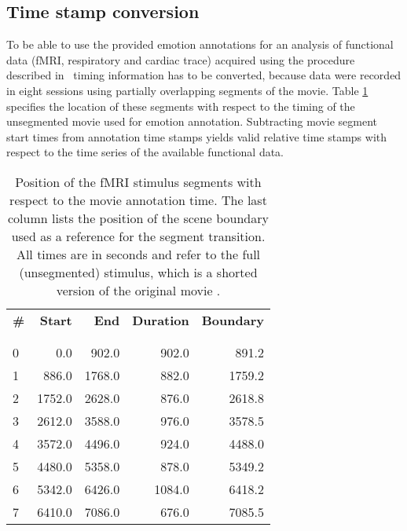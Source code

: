 \subsection*{Time stamp conversion}

To be able to use the provided emotion annotations for an analysis of
functional data (fMRI, respiratory and cardiac trace) acquired using the
procedure described in~\cite{HBI+14} timing information has to be converted,
because data were recorded in eight sessions using partially overlapping
segments of the movie. Table \ref{tab:timing} specifies the location of these
segments with respect to the timing of the unsegmented movie used for emotion
annotation. Subtracting movie segment start times from annotation time stamps
yields valid relative time stamps with respect to the time series of the
available functional data.

\begin{table}
  \centering
  \begin{tabular}{lrrrr}
    \textbf{\#}  & \textbf{Start}  & \textbf{End}    & \textbf{Duration}& \textbf{Boundary} \\
  \\\hline\\
   0  & 0.0    & 902.0  & 902.0  & 891.2    \\
   1  & 886.0  & 1768.0 & 882.0  & 1759.2   \\
   2  & 1752.0 & 2628.0 & 876.0  & 2618.8   \\
   3  & 2612.0 & 3588.0 & 976.0  & 3578.5   \\
   4  & 3572.0 & 4496.0 & 924.0  & 4488.0   \\
   5  & 4480.0 & 5358.0 & 878.0  & 5349.2   \\
   6  & 5342.0 & 6426.0 & 1084.0 & 6418.2   \\
   7  & 6410.0 & 7086.0 & 676.0  & 7085.5   \\
  \end{tabular}

  \caption{Position of the fMRI stimulus segments with respect to the movie
    annotation time. The last column lists the position of the scene boundary
    used as a reference for the segment transition. All times are in seconds
    and refer to the full (unsegmented) stimulus, which is a shorted version of
    the original movie \cite{HBI+14}.}

  \label{tab:timing}
\end{table}

%

